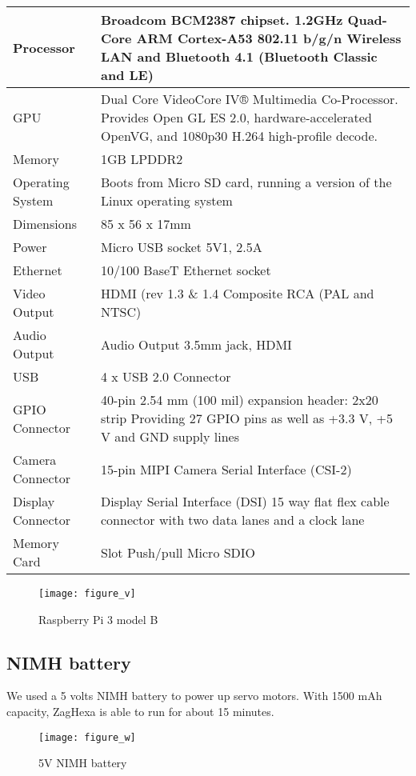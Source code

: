 \begin{center}
\begin{tabular}{ |l||p{12cm}|}
	\hline
	Processor      & Broadcom BCM2387 chipset. 1.2GHz Quad-Core ARM Cortex-A53 802.11 b/g/n Wireless LAN and Bluetooth 4.1 (Bluetooth Classic and LE)\\ \hline
	GPU               & Dual Core VideoCore IV® Multimedia Co-Processor. Provides Open GL ES 2.0, hardware-accelerated OpenVG, and 1080p30 H.264 high-profile decode. \\ \hline
	Memory          & 1GB LPDDR2  \\ \hline
	Operating System  & Boots from Micro SD card, running a version of the Linux operating system  \\ \hline
	Dimensions     & 85 x 56 x 17mm  \\ \hline
	Power             & Micro USB socket 5V1, 2.5A  \\ \hline
	Ethernet          & 10/100 BaseT Ethernet socket  \\ \hline
	Video Output   & HDMI (rev 1.3 \& 1.4 Composite RCA (PAL and NTSC)  \\ \hline
	Audio Output   & Audio Output 3.5mm jack, HDMI     \\ \hline
	USB                 & 4 x USB 2.0 Connector   \\ \hline
	GPIO Connector    & 40-pin 2.54 mm (100 mil) expansion header: 2x20 strip Providing 27 GPIO pins as well as +3.3 V, +5 V and GND supply lines \\ \hline
	Camera Connector  & 15-pin MIPI Camera Serial Interface (CSI-2) \\ \hline
	Display Connector & Display Serial Interface (DSI) 15 way flat flex cable connector with two data lanes and a clock lane    \\ \hline
	Memory Card       & Slot Push/pull Micro SDIO  \\ \hline
\end{tabular}
\end{center}

\begin{figure}[h]
	\centering
	\texttt{[image: figure\_v]}
	\caption{Raspberry Pi 3 model B}
	\label{figure_v}
\end{figure}

\subsection{NIMH battery}
We used a 5 volts NIMH battery to power up servo motors. With 1500 mAh capacity, ZagHexa is able to run for about 15 minutes.

\begin{figure}[h]
	\centering
	\texttt{[image: figure\_w]}
	\caption{5V NIMH battery}
	\label{figure_w}
\end{figure}